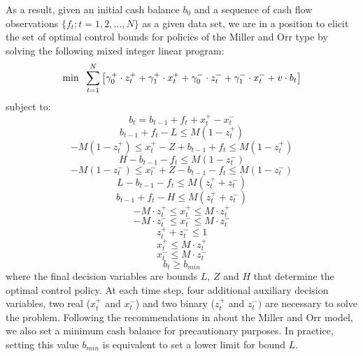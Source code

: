 As a result, given an initial cash balance $b_0$ and a sequence of cash flow observations $\{f_t:t=1,2,\ldots, N\}$ as a given data set, we are in a position to elicit the set of optimal control bounds for policies of the Miller and Orr type by solving the following mixed integer linear program:
\begin{equation}
\operatorname{min} \hspace{2mm} \sum_{t=1}^N \left[ \gamma_0^+ \cdot z_t^+  + \gamma_1^+ \cdot  x_t^+ +  \gamma_0^-  \cdot z_t^-  + \gamma_1^- \cdot x_t^- + v \cdot b_t \right]
\label{eq:lp_miller}
\end{equation}
subject to:
\begin{equation}
b_t = b_{t-1} + f_t + x_t^+ - x_t^-   
\label{eq:miller_cont}
\end{equation}
\begin{equation}
b_{t-1} + f_t - L \leq M (1 - z_t^+)
\label{eq:bound_cont}
\end{equation}
\begin{equation}
-M (1 - z_t^+) \leq x_t^+ - Z + b_{t-1} + f_t \leq M (1 - z_t^+)
\end{equation}
\begin{equation}
H - b_{t-1} - f_t \leq M (1 - z_t^-)
\end{equation}
\begin{equation}
-M (1 - z_t^-) \leq x_t^- + Z - b_{t-1} -f_t \leq M (1 - z_t^-)
\end{equation}
\begin{equation}
L - b_{t-1} - f_t \leq M (z_t^+ + z_t^-)
\end{equation}
\begin{equation}
b_{t-1} + f_t - H \leq M (z_t^+ + z_t^-)
\end{equation}
\begin{equation}
-M \cdot z_t^+  \leq x_t^+ \leq M \cdot z_t^+ 
\end{equation}
\begin{equation}
-M \cdot z_t^- \leq x_t^- \leq M \cdot z_t^- 
\end{equation}
\begin{equation}
z_t^+ + z_t^- \leq 1
\end{equation}
\begin{equation}
x_t^+ \leq M \cdot z_t^+ 
\end{equation}
\begin{equation}
x_t^- \leq M \cdot z_t^- 
\end{equation}
\begin{equation}
b_t \geq b_{min}
\label{eq:bmin}
\end{equation}
where the final decision variables are bounds $L$, $Z$ and $H$ that determine the optimal control policy. At each time step, four additional auxiliary decision variables, two real ($x_t^+$ and $x_t^-$) and two binary ($z_t^+$ and $z_t^-)$ are necessary to solve the problem. Following the recommendations in \cite{ross2002fundamentals} about the Miller and Orr model, we also set a minimum cash balance for precautionary purposes. In practice, setting this value $b_{min}$ is equivalent to set a lower limit for bound $L$.

